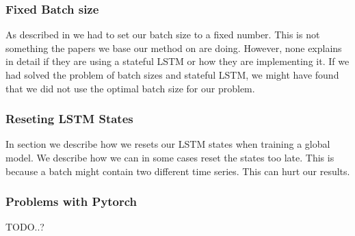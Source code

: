 

\subsubsection{Fixed Batch size}
As described in  we had to set our batch size to
a fixed number. This is not something the papers we base our method on are doing. However,
none explains in detail if they are using a stateful LSTM or how they are implementing it.
If we had solved the problem of batch sizes and stateful LSTM, we might have found that we did not
use the optimal batch size for our problem.

\subsubsection{Reseting LSTM States}
In section  we describe how we resets our LSTM states
when training a global model. We describe how we can
in some cases reset the states too late. This is because a batch might contain two different time series.
This can hurt our results.

\subsubsection{Problems with Pytorch}
TODO..?
